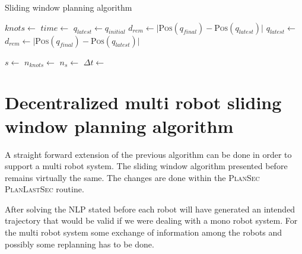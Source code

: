 \documentclass[eprint]{actapoly}
\begin{document}
\begin{algorithm}
    \caption{Sliding window planning algorithm}
    \label{swpa}
    \begin{algorithmic}[1] %
	    \State $knots \gets $
	    \State $time \gets $
	    \State $q_{latest} \gets q_{initial}$
	    \State $d_{rem} \gets |${\scshape Pos}$(q_{final}) - ${\scshape Pos}$(q_{latest})|$
		\State $q_{latest} \gets $
		\State $d_{rem} \gets |${\scshape Pos}$(q_{final}) - ${\scshape Pos}$(q_{latest})|$
		
	    \EndWhile\label{planningwhile}
	    \State $s \gets $
	    \State $n_{knots} \gets $
	    \State $n_{s} \gets $
	    \State $\Delta t \gets $
	    
        \EndProcedure
    \end{algorithmic}
\end{algorithm}


\section{Decentralized multi robot sliding window planning algorithm}


A straight forward extension of the previous algorithm can be done in order to
support a multi robot system. The sliding window algorithm presented before remains
virtually the same. The changes are done within the {\scshape PlanSec} {\scshape PlanLastSec} routine.

After solving the NLP stated before each robot will have generated an intended trajectory that would be valid
if we were dealing with a mono robot system.
For the multi robot system some exchange of information among the robots and possibly some replanning has to be done.
\end{document}
